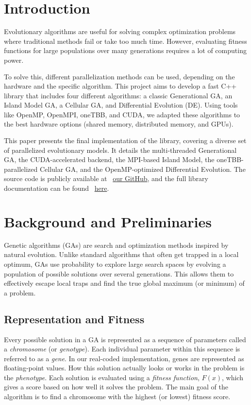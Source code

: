 \documentclass[conference]{IEEEtran}
\begin{document}
    \section{Introduction}
    Evolutionary algorithms are useful for solving complex optimization problems where traditional methods fail or take too much time. However, evaluating fitness functions for large populations over many generations requires a lot of computing power. 

    To solve this, different parallelization methods can be used, depending on the hardware and the specific algorithm. This project aims to develop a fast C++ library that includes four different algorithms: a classic Generational GA, an Island Model GA, a Cellular GA, and Differential Evolution (DE). Using tools like OpenMP, OpenMPI, oneTBB, and CUDA, we adapted these algorithms to the best hardware options (shared memory, distributed memory, and GPUs). 

    This paper presents the final implementation of the library, covering a diverse set of parallelized evolutionary models. It details the multi-threaded Generational GA, the CUDA-accelerated backend, the MPI-based Island Model, the oneTBB-parallelized Cellular GA, and the OpenMP-optimized Differential Evolution. The source code is publicly available at \faGithub\ \href{https://github.com/Martik-k/GALib-Parallel}{our GitHub}, and the full library documentation can be found \faBook\ \href{https://martik-k.github.io/GALib-Parallel/}{here}.

    \section{Background and Preliminaries}

    Genetic algorithms (GAs) are search and optimization methods inspired by natural evolution. Unlike standard algorithms that often get trapped in a local optimum, GAs use probability to explore large search spaces by evolving a population of possible solutions over several generations. This allows them to effectively escape local traps and find the true global maximum (or minimum) of a problem.

    \subsection{Representation and Fitness}
    Every possible solution in a GA is represented as a sequence of parameters called a \textit{chromosome} (or \textit{genotype}). Each individual parameter within this sequence is referred to as a \textit{gene}. In our real-coded implementation, genes are represented as floating-point values. How this solution actually looks or works in the problem is the \textit{phenotype}. Each solution is evaluated using a \textit{fitness function}, $F(x)$, which gives a score based on how well it solves the problem. The main goal of the algorithm is to find a chromosome with the highest (or lowest) fitness score.
\end{document}
